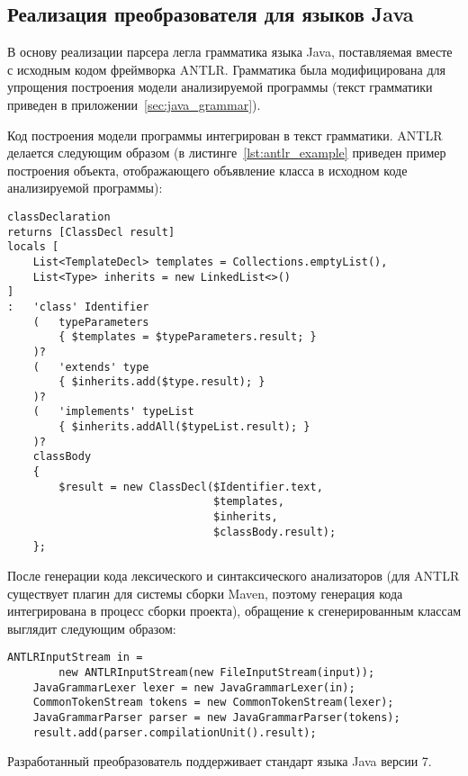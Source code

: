 \subsection{Реализация преобразователя для языков Java}

В основу реализации парсера легла грамматика языка Java, поставляемая вместе с
исходным кодом фреймворка ANTLR. Грамматика была модифицирована для упрощения
построения модели анализируемой программы (текст грамматики приведен в
приложении~\ref{sec:java_grammar}).

Код построения модели программы интегрирован в текст грамматики. ANTLR
делается следующим образом (в листинге~\ref{lst:antlr_example} приведен пример
построения объекта, отображающего объявление класса в исходном коде
анализируемой программы):

\begin{lstlisting}[label={lst:antlr_example}, caption={Пример построения модели}]
classDeclaration
returns [ClassDecl result]
locals [
    List<TemplateDecl> templates = Collections.emptyList(),
    List<Type> inherits = new LinkedList<>()
]
:   'class' Identifier
    (   typeParameters
        { $templates = $typeParameters.result; }
    )?
    (   'extends' type
        { $inherits.add($type.result); }
    )?
    (   'implements' typeList
        { $inherits.addAll($typeList.result); }
    )?
    classBody
    {
        $result = new ClassDecl($Identifier.text,
                                $templates,
                                $inherits,
                                $classBody.result);
    };
\end{lstlisting}

После генерации кода лексического и синтаксического анализаторов (для ANTLR
существует плагин для системы сборки Maven, поэтому генерация кода интегрирована
в процесс сборки проекта), обращение к сгенерированным классам выглядит
следующим образом:

\begin{lstlisting}[caption={Использование сгенерированных классов}]
    ANTLRInputStream in =
        new ANTLRInputStream(new FileInputStream(input));
    JavaGrammarLexer lexer = new JavaGrammarLexer(in);
    CommonTokenStream tokens = new CommonTokenStream(lexer);
    JavaGrammarParser parser = new JavaGrammarParser(tokens);
    result.add(parser.compilationUnit().result);
\end{lstlisting}

Разработанный преобразователь поддерживает стандарт языка Java версии 7.

